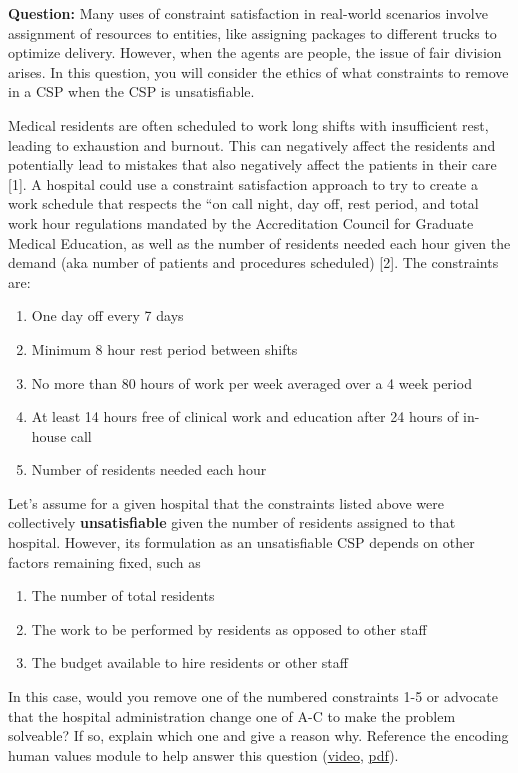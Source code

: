 \documentclass{article}
\theoremstyle{case}
\theoremstyle{definition}
\begin{document}
\textbf{Question:} Many uses of constraint satisfaction in real-world scenarios involve assignment of resources to entities, like assigning packages to different trucks to optimize delivery. However, when the agents are people, the issue of fair division arises. In this question, you will consider the ethics of what constraints to remove in a CSP when the CSP is unsatisfiable.

Medical residents are often scheduled to work long shifts with insufficient rest, leading to exhaustion and burnout. This can negatively affect the residents and potentially lead to mistakes that also negatively affect the patients in their care [1]. A hospital could use a constraint satisfaction approach to try to create a work schedule that respects the ``on call night, day off, rest period, and total work hour regulations mandated by the Accreditation Council for Graduate Medical Education, as well as the number of residents needed each hour given the demand (aka number of patients and procedures scheduled) [2]. The constraints are:
\begin{enumerate}
    \item One day off every 7 days
    \item Minimum 8 hour rest period between shifts
    \item No more than 80 hours of work per week averaged over a 4 week period
    \item At least 14 hours free of clinical work and education after 24 hours of in-house call
    \item Number of residents needed each hour
\end{enumerate}

Let's assume for a given hospital that the constraints listed above were collectively \textbf{unsatisfiable} given the number of residents assigned to that hospital. However, its formulation as an unsatisfiable CSP depends on other factors remaining fixed, such as
\begin{enumerate}[label=\Alph*.]
    \item The number of total residents
    \item The work to be performed by residents as opposed to other staff
    \item The budget available to hire residents or other staff
\end{enumerate}

In this case, would you remove one of the numbered constraints 1-5 or advocate that the hospital administration change one of A-C to make the problem solveable? If so, explain which one and give a reason why. Reference the encoding human values module to help answer this question (\href{https://www.youtube.com/watch?v=aWAqgzXENr0&ab_channel=StanfordOnline}{video}, \href{https://stanford-cs221.github.io/spring2026-extra/modules/markov-networks/encoding-human-values.pdf}{pdf}).
\end{document}

